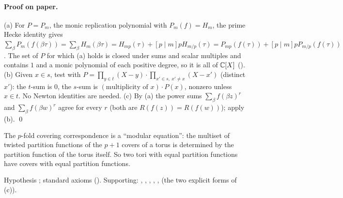 \paragraph{Proof on paper.}  (a) For $P=P_m$, the monic replication polynomial with $P_m(f)=H_m$, the prime Hecke identity
gives $\sum_\beta P_m(f(\beta\tau))=\sum_\beta H_m(\beta\tau)=H_{mp}(\tau)+[p\mid m]pH_{m/p}(\tau)=P_{mp}(f(\tau))+[p\mid m]pP_{m/p}(f(\tau))$.  The
set of $P$ for which (a) holds is closed under sums and scalar multiples and contains $1$ and a monic polynomial of each
positive degree, so it is all of ${\mathbb{C}}[X]$ ().  (b) Given $x\in s$, test with
$P=\prod_{y\in t}(X-y)\cdot\prod_{x'\in s,\ x'\ne x}(X-x')$ (distinct $x'$): the $t$-sum is $0$, the $s$-sum is
$(\text{multiplicity of }x)\cdot P(x)$, nonzero unless $x\in t$.  No Newton identities are needed.  (c) By (a) the power sums
$\sum_\beta f(\beta z)^r$ and $\sum_\beta f(\beta w)^r$ agree for every $r$ (both are $R(f(z))=R(f(w))$); apply (b). \qed
\begin{physics}The $p$-fold covering correspondence is a ``modular equation'': the multiset of twisted partition functions of
the $p+1$ covers of a torus is determined by the partition function of the torus itself.  So two tori with equal partition
functions have covers with equal partition functions.\end{physics}
\begin{status}Hypothesis ; standard axioms ().
Supporting: , , ,
, ,  (the two explicit forms of (c)).\end{status}

